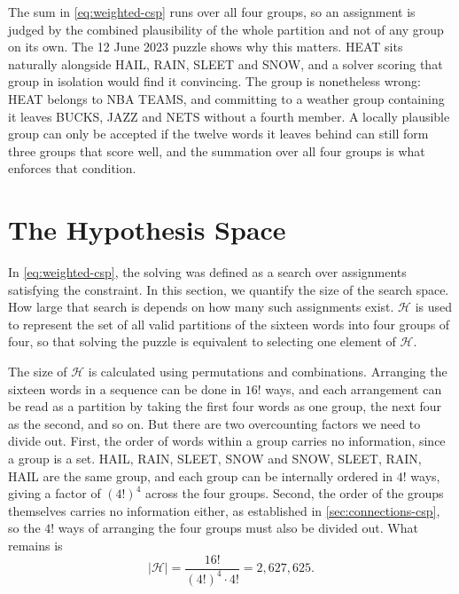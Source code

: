 The sum in \autoref{eq:weighted-csp} runs over all four groups, so an assignment is judged by the combined plausibility of the whole partition and not of any group on its own. The 12 June 2023 puzzle shows why this matters. HEAT sits naturally alongside HAIL, RAIN, SLEET and SNOW, and a solver scoring that group in isolation would find it convincing. The group is nonetheless wrong: HEAT belongs to NBA TEAMS, and committing to a weather group containing it leaves BUCKS, JAZZ and NETS without a fourth member. A locally plausible group can only be accepted if the twelve words it leaves behind can still form three groups that score well, and the summation over all four groups is what enforces that condition.

\section{The Hypothesis Space}
\label{sec:hypothesis-space}

In \autoref{eq:weighted-csp}, the solving was defined as a search over assignments satisfying the constraint. In this section, we quantify the size of the search space. How large that search is depends on how many such assignments exist. $\mathcal{H}$ is used to represent the set of all valid partitions of the sixteen words into four groups of four, so that solving the puzzle is equivalent to selecting one element of $\mathcal{H}$.

The size of $\mathcal{H}$ is calculated using permutations and combinations. Arranging the sixteen words in a sequence can be done in $16!$ ways, and each arrangement can be read as a partition by taking the first four words as one group, the next four as the second, and so on. But there are two overcounting factors we need to divide out. First, the order of words within a group carries no information, since a group is a set. HAIL, RAIN, SLEET, SNOW and SNOW, SLEET, RAIN, HAIL are the same group, and each group can be internally ordered in $4!$ ways, giving a factor of $(4!)^4$ across the four groups. Second, the order of the groups themselves carries no information either, as established in \autoref{sec:connections-csp}, so the $4!$ ways of arranging the four groups must also be divided out. What remains is
\begin{equation}
|\mathcal{H}| = \frac{16!}{(4!)^4 \cdot 4!} = 2{,}627{,}625.
\label{eq:hypothesis-count}
\end{equation}

